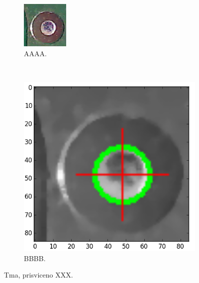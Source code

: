 \begin{figure}[H]
	\centering
	\begin{subfigure}[b]{0.4\textwidth}
		\centering
		\includegraphics[width=0.7\linewidth, trim = 0cm -0.2cm 0cm 0cm]{obrazky/fiduc_tma_prisviceno_crop.png}%
		\caption{AAAA.}
		\label{fig:tma}
	\end{subfigure}
	~
	\begin{subfigure}[b]{0.4\textwidth}
		\centering
		\includegraphics[width=0.8\linewidth]{obrazky/fiduc_tma_prisviceno_crop3.png}%
		\caption{BBBB.}
		\label{fig:tma2}
	\end{subfigure}

	\caption{Tma, prisviceno XXX.}
\end{figure}

